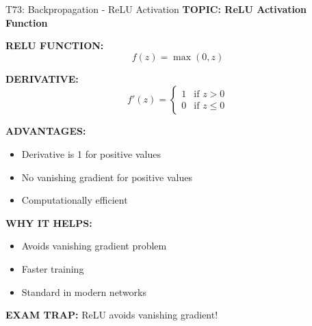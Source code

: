 \documentclass[8pt]{beamer}
\begin{document}
	\begin{frame}{T73: Backpropagation - ReLU Activation}
		\fontsize{6.5}{7.5}\selectfont
		\textbf{TOPIC: ReLU Activation Function}
		
		\vspace{0.1cm}
		\textbf{RELU FUNCTION:}
		\[
		f(z) = \max(0, z)
		\]
		
		\vspace{0.1cm}
		\textbf{DERIVATIVE:}
		\[
		f'(z) = \begin{cases} 1 & \text{if } z > 0 \\ 0 & \text{if } z \leq 0 \end{cases}
		\]
		
		\vspace{0.1cm}
		\textbf{ADVANTAGES:}
		\begin{itemize}
			\item Derivative is 1 for positive values
			\item No vanishing gradient for positive values
			\item Computationally efficient
		\end{itemize}
		
		\vspace{0.1cm}
		\textbf{WHY IT HELPS:}
		\begin{itemize}
			\item Avoids vanishing gradient problem
			\item Faster training
			\item Standard in modern networks
		\end{itemize}
		
		\textcolor{myred}{\textbf{EXAM TRAP:}} ReLU \textcolor{myblue}{avoids vanishing gradient}!
	\end{frame}
	
\end{document}
